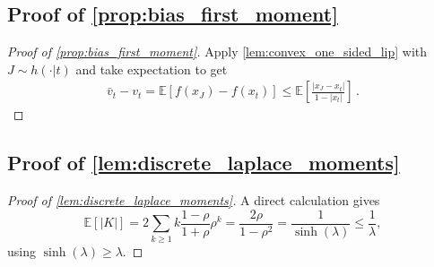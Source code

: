\documentclass{article}
\theoremstyle{plain}
\theoremstyle{definition}
\theoremstyle{plain}
\newcommand{\E}{\mathbb E}
\begin{document}
\subsection{Proof of \texorpdfstring{\cref{prop:bias_first_moment}}{Proposition (Bias bound via the first absolute moment)}}
\label{proof:prop:bias_first_moment}
\begin{proof}[Proof of \cref{prop:bias_first_moment}]
    Apply \cref{lem:convex_one_sided_lip} with $J \sim h(\cdot|t)$ and take expectation to get
    \begin{align}
        \bar v_t-v_t = \E[f(x_J)-f(x_t)]
        \le \E\left[\frac{|x_J-x_t|}{1-|x_t|}\right]\,.
    \end{align}
\end{proof}

\subsection{Proof of \texorpdfstring{\cref{lem:discrete_laplace_moments}}{Lemma (Moments of the symmetric discrete Laplace law)}}
\label{proof:lem:discrete_laplace_moments}
\begin{proof}[Proof of \cref{lem:discrete_laplace_moments}]
    A direct calculation gives
    \[
        \E\left[|K|\right]
        = 2\sum_{k\ge 1} k\frac{1-\rho}{1+\rho}\rho^k
        = \frac{2\rho}{1-\rho^2}
        = \frac{1}{\sinh(\lambda)}
        \le \frac{1}{\lambda},
    \]
    using $\sinh(\lambda)\ge \lambda$.
\end{proof}
\end{document}

